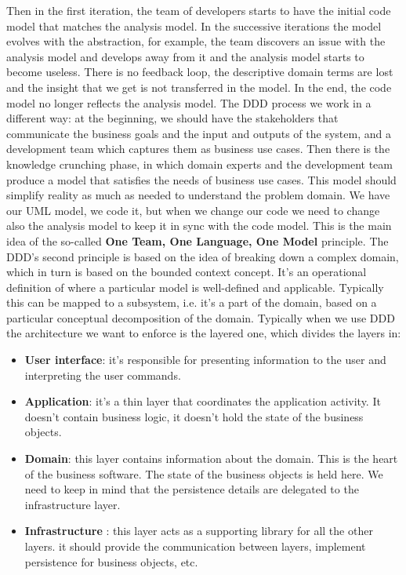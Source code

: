 Then in the first iteration, the team of developers starts to have the initial code model that matches the analysis model.
In the successive iterations the model evolves with the abstraction, for example, the team discovers an issue with the analysis model and develops away from it and the analysis model starts to become useless.
There is no feedback loop, the descriptive domain terms are lost and the insight that we get is not transferred in the model.
In the end, the code model no longer reflects the analysis model.
The DDD process we work in a different way: at the beginning, we should have the stakeholders that communicate the business goals and the input and outputs of the system, and a development team which captures them as business use cases.
Then there is the knowledge crunching phase, in which domain experts and the development team produce a model that satisfies the needs of business use cases.
This model should simplify reality as much as needed to understand the problem domain.
We have our UML model, we code it, but when we change our code we need to change also the analysis model to keep it in sync with the code model.
This is the main idea of the so-called \textbf{One Team, One Language, One Model} principle.
The DDD's second principle is based on the idea of breaking down a complex domain, which in turn is based on the bounded context concept.
It's an operational definition of where a particular model is well-defined and applicable.
Typically this can be mapped to a subsystem, i.e. it's a part of the domain, based on a particular conceptual decomposition of the domain.
Typically when we use DDD the architecture we want to enforce is the layered one, which divides the layers in:
\begin{itemize}
    \item \textbf{User interface}: it's responsible for presenting information to the user and interpreting the user commands.
    \item \textbf{Application}: it's a thin layer that coordinates the application activity. It doesn't contain business logic, it doesn't hold the state of the business objects.
    \item \textbf{Domain}: this layer contains information about the domain. This is the heart of the business software. The state of the business objects is held here. We need to keep in mind that the persistence details are delegated to the infrastructure layer.
    \item \textbf{Infrastructure} : this layer acts as a supporting library for all the other layers. it should provide the communication between layers, implement persistence for business objects, etc.
\end{itemize}

